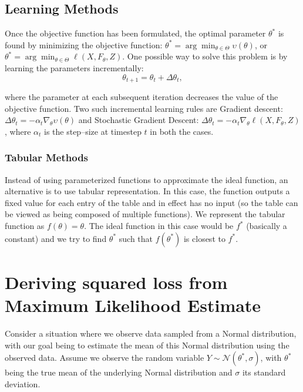 \documentclass[twoside]{article}
\begin{document}
\subsection{Learning Methods}
Once the objective function has been formulated, the optimal parameter $\theta^*$ is found by minimizing the objective function: $\theta^* = \arg \min_{\theta \in \Theta} \upsilon(\theta)$, or $\theta^* = \arg \min_{\theta \in \Theta} \ell(X, F_\theta, Z)$. One possible way to solve this problem is by learning the parameters incrementally:
\begin{equation}
  \theta_{t+1} = \theta_t + \Delta \theta_t, \label{eq: update_rule}
\end{equation}

where the parameter at each subsequent iteration decreases the value of the objective function. Two such incremental learning rules are Gradient descent: $\Delta \theta_t = -\alpha_t \nabla_\theta \upsilon(\theta)$ and Stochastic Gradient Descent: $\Delta \theta_t = -\alpha_t \nabla_\theta \ell(X, F_\theta, Z)$, where $\alpha_t$ is the step--size at timestep $t$ in both the cases.

\subsubsection*{Tabular Methods}
Instead of using parameterized functions to approximate the ideal function, an alternative is to use tabular representation. In this case, the function outputs a fixed value for each entry of the table and in effect has no input (so the table can be viewed as being composed of multiple functions). We represent the tabular function as $f(\theta) = \theta$. The ideal function in this case would be $f^*$ (basically a constant) and we try to find $\theta^*$ such that $f(\theta^*)$ is closest to $f^*$.

\section{Deriving squared loss from Maximum Likelihood Estimate}
Consider a situation where we observe data sampled from a Normal distribution, with our goal being to estimate the mean of this Normal distribution using the observed data. Assume we observe the random variable $Y \sim \mathcal{N}(\theta^*, \sigma)$, with $\theta^*$ being the true mean of the underlying Normal distribution and $\sigma$ its standard deviation.
\end{document}
